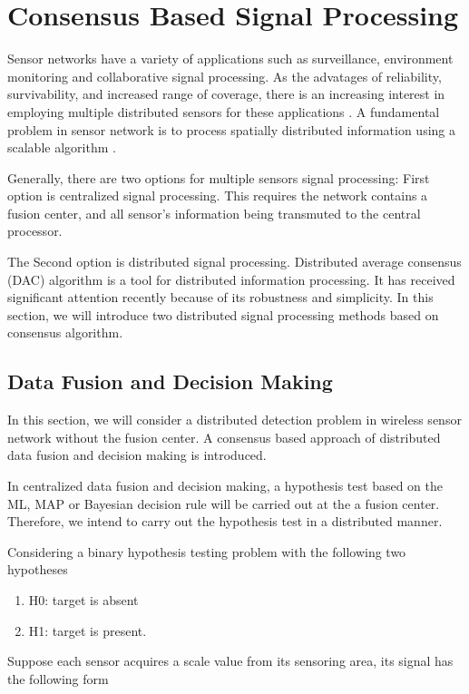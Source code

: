 
\section{Consensus Based Signal Processing}

Sensor networks have a variety of applications such as surveillance,
environment monitoring and collaborative signal processing. As the
advatages of reliability, survivability, and increased range of coverage,
there is an increasing interest in employing multiple distributed
sensors for these applications \cite{Chair1986}. A fundamental problem
in sensor network is to process spatially distributed information
using a scalable algorithm \cite{Olfati-Saber2005a}. 

Generally, there are two options for multiple sensors signal processing:
First option is centralized signal processing. This requires the network
contains a fusion center, and all sensor's information being transmuted
to the central processor. 

The Second option is distributed signal processing. Distributed average
consensus (DAC) algorithm is a tool for distributed information processing.
It has received significant attention recently because of its robustness
and simplicity. In this section, we will introduce two distributed
signal processing methods based on consensus algorithm.


\subsection{Data Fusion and Decision Making}

In this section, we will consider a distributed detection problem
in wireless sensor network without the fusion center. A consensus
based approach of distributed data fusion and decision making is introduced.

In centralized data fusion and decision making, a hypothesis test
based on the ML, MAP or Bayesian decision rule will be carried out
at the a fusion center.  Therefore, we intend to carry out the hypothesis
test in a distributed manner. 

Considering a binary hypothesis testing problem with the following
two hypotheses
\begin{enumerate}
\item H0: target is absent
\item H1: target is present.
\end{enumerate}
Suppose each sensor acquires a scale value from its sensoring area,
its signal has the following form

